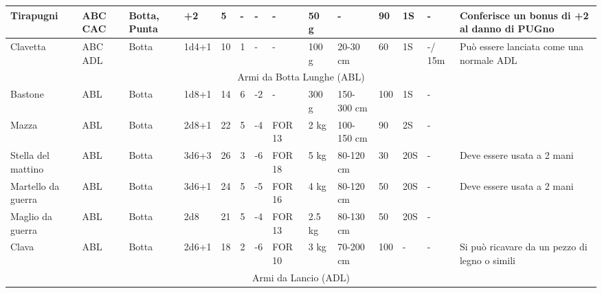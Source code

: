 {\begin{longtable}{|p{1.5cm}|p{0.7cm}|p{0.9cm}|p{0.9cm}|l|l|l|p{0.9cm}|p{0.8cm}|p{1.0cm}|l|l|p{0.75cm}|p{3.2cm}|}
  \raggedright Tirapugni& \raggedright ABC CAC& \raggedright Botta, Punta& \raggedright +2& \raggedright 5& \raggedright -& \raggedright -& \raggedright -& \raggedright 50 g& \raggedright -& \raggedright 90& \raggedright 1S& \raggedright -& \raggedright Conferisce un bonus di +2 al danno di PUGno\tabularnewline \hline
  \raggedright Clavetta& \raggedright ABC ADL& \raggedright Botta& \raggedright 1d4+1& \raggedright 10& \raggedright 1& \raggedright -& \raggedright -& \raggedright 100 g& \raggedright 20-30 cm& \raggedright 60& \raggedright 1S& \raggedright -/ 15m& \raggedright Pu\`o essere lanciata come una normale ADL\tabularnewline \hline
  \hline\multicolumn{14}{|c|}{\normalsize\sc Armi da Botta Lunghe (ABL)}\tabularnewline \hline\hline
  \raggedright Bastone& \raggedright ABL& \raggedright Botta& \raggedright 1d8+1& \raggedright 14& \raggedright 6& \raggedright -2& \raggedright -& \raggedright 300 g& \raggedright 150-300 cm& \raggedright 100& \raggedright 1S& \raggedright -& \raggedright \tabularnewline \hline
  \raggedright Mazza& \raggedright ABL& \raggedright Botta& \raggedright 2d8+1& \raggedright 22& \raggedright 5& \raggedright -4& \raggedright FOR 13& \raggedright 2 kg& \raggedright 100-150 cm& \raggedright 90& \raggedright 2S& \raggedright -& \raggedright \tabularnewline \hline
  \raggedright Stella del mattino& \raggedright ABL& \raggedright Botta& \raggedright 3d6+3& \raggedright 26& \raggedright 3& \raggedright -6& \raggedright FOR 18& \raggedright 5 kg& \raggedright 80-120 cm& \raggedright 30& \raggedright 20S& \raggedright -& \raggedright Deve essere usata a 2 mani\tabularnewline \hline
  \raggedright Martello da guerra& \raggedright ABL& \raggedright Botta& \raggedright 3d6+1& \raggedright 24& \raggedright 5& \raggedright -5& \raggedright FOR 16& \raggedright 4 kg& \raggedright 80-120 cm& \raggedright 50& \raggedright 20S& \raggedright -& \raggedright Deve essere usata a 2 mani\tabularnewline \hline
  \raggedright Maglio da guerra& \raggedright ABL& \raggedright Botta& \raggedright 2d8& \raggedright 21& \raggedright 5& \raggedright -4& \raggedright FOR 13& \raggedright 2.5 kg& \raggedright 80-130 cm& \raggedright 50& \raggedright 20S& \raggedright -& \raggedright \tabularnewline \hline
  \raggedright Clava& \raggedright ABL& \raggedright Botta& \raggedright 2d6+1& \raggedright 18& \raggedright 2& \raggedright -6& \raggedright FOR 10& \raggedright 3 kg& \raggedright 70-200 cm& \raggedright 100& \raggedright -& \raggedright -& \raggedright Si pu\`o ricavare da un pezzo di legno o simili\tabularnewline \hline
  \hline\multicolumn{14}{|c|}{\normalsize\sc Armi da Lancio (ADL)}\tabularnewline \hline\hline

\end{longtable}}
